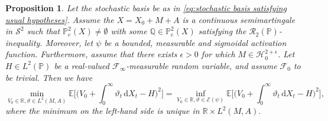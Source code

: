 \documentclass[11pt,a4paper,twoside,openany]{report}
\numberwithin{equation}{section}
\newcommand{\diff}{\mathrm{d}}
\theoremstyle{plain} %
\newtheorem{proposition}[theorem]{Proposition}
\theoremstyle{definition} %
\theoremstyle{remark} %
\begin{document}
\begin{proposition}\label{prop:continuous time deep mean variance hedging for semimartingales under compactness}
    Let the stochastic basis be as in \eqref{eq:stochastic basis satisfying usual hypotheses}.
    Assume the \(X=X_0+M+A\) is a continuous semimartingale in \(\mathcal{S}^2\) such that  \(\mathbb{P}_e^2(X)\neq\emptyset\) with some \(\mathbb{Q}\in\mathbb{P}_e^2(X)\) satisfying the \(\mathcal{R}_2(\mathbb{P})\)-inequality. Moreover, let \(\psi\) be a bounded, measurable and sigmoidal activation function. Furthermore, assume that there exists \(\epsilon>0\) for which \(M\in\mathcal{H}_0^{2+\epsilon}\). Let \(H\in  L^2(\mathbb{P})\) be a real-valued \(\mathcal{F}_{\infty}\)-measurable random variable, and assume \(\mathcal{F}_0\) to be trivial. Then we have
\begin{equation}\label{eq:min equals inf semimartingale mean variance hedging with epsilon integrability}
    \min_{V_0\in\mathbb{R},\vartheta\in L^2(M,A)}\mathbb{E}\bigg[\bigg(V_0+\int_{0}^{\infty}\vartheta_t\,\diff X_t-H\bigg)^2\bigg]
    =\inf_{V_0\in\mathbb{R},\vartheta\in \mathcal{E}(\psi)}
    \mathbb{E}\bigg[\bigg(V_0+\int_{0}^{\infty}\vartheta_t\,\diff X_t-H\bigg)^2\bigg],
\end{equation}
where the minimum on the left-hand side is unique in \(\mathbb{R}\times L^2(M,A).\)
\end{proposition}
\end{document}
